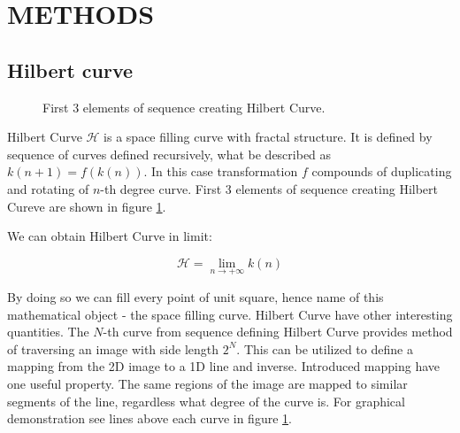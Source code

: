 \documentclass[a4paper, 10 pt, journal]{ieeeconf}
\begin{document}
\section{METHODS}

\subsection{Hilbert curve}

\begin{figure}
	\centering
\caption{First 3 elements of sequence creating Hilbert Curve.}
	\label{fig:hilbert}
\end{figure}

Hilbert Curve $\mathcal{H}$ is a space filling curve with fractal structure. It is defined by sequence of curves defined recursively, what be described as $k(n+1) = f(k(n))$. In this case transformation $f$ compounds of duplicating and rotating of $n$-th degree curve. First 3 elements of sequence creating Hilbert Cureve are shown in figure \ref{fig:hilbert}.

We can obtain Hilbert Curve in limit:

\begin{equation}
	\mathcal{H} = \lim_{n \rightarrow + \infty } k(n)
\end{equation}

By doing so we can fill every point of unit square, hence name of this mathematical object - the space filling curve. Hilbert Curve have other interesting quantities. The $N$-th curve from sequence defining Hilbert Curve provides method of traversing an image with side length $2^{N}$. This can be utilized to define a mapping from the 2D image to a 1D line and inverse. Introduced mapping have one useful property. The same regions of the image are mapped to similar segments of the line, regardless what degree of the curve is. For graphical demonstration see lines above each curve in figure \ref{fig:hilbert}.
\end{document}
